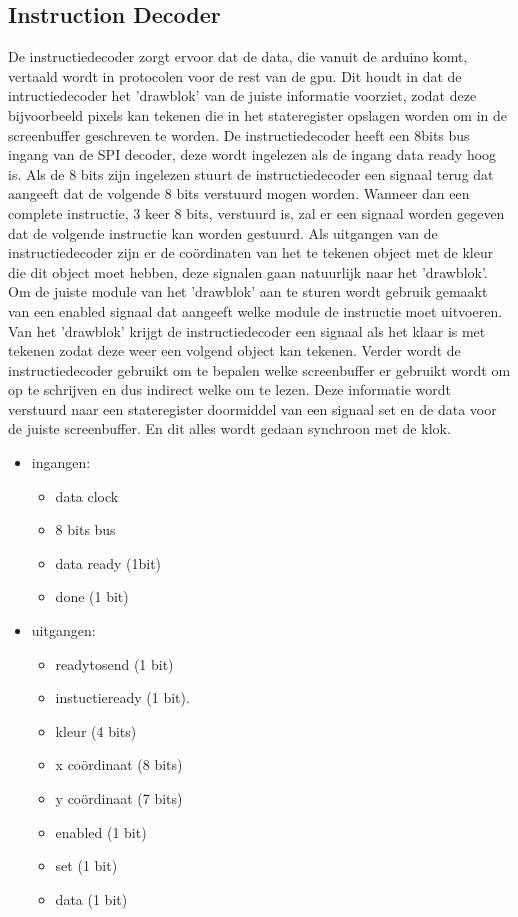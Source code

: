 \subsection{Instruction Decoder}
De instructiedecoder zorgt ervoor dat de data, die vanuit de arduino komt, vertaald wordt in protocolen voor de rest van de gpu. 
Dit houdt in dat de intructiedecoder het 'drawblok' van de juiste informatie voorziet, zodat deze bijvoorbeeld pixels kan tekenen die in het stateregister opslagen worden om in de screenbuffer geschreven te worden.
De instructiedecoder heeft een 8bits bus ingang van de SPI decoder, deze wordt ingelezen als de ingang data ready hoog is. Als de 8 bits zijn ingelezen stuurt de instructiedecoder een signaal terug dat aangeeft dat de volgende 8 bits verstuurd mogen worden.
Wanneer dan een complete instructie, 3 keer 8 bits, verstuurd is, zal er een signaal worden gegeven dat de volgende instructie kan worden gestuurd.
Als uitgangen van de instructiedecoder zijn er de coördinaten van het te tekenen object met de kleur die dit object moet hebben, deze signalen gaan natuurlijk naar het 'drawblok'.
Om de juiste module van het 'drawblok' aan te sturen wordt gebruik gemaakt van een enabled signaal dat aangeeft welke module de instructie moet uitvoeren.
Van het 'drawblok' krijgt de instructiedecoder een signaal als het klaar is met tekenen zodat deze weer een volgend object kan tekenen. 
Verder wordt de instructiedecoder gebruikt om te bepalen welke screenbuffer er gebruikt wordt om op te schrijven en dus indirect welke om te lezen. Deze informatie wordt verstuurd naar een stateregister doormiddel van een signaal set en de data voor de juiste screenbuffer.
En dit alles wordt gedaan synchroon met de klok.

\begin {itemize}
\item ingangen:
\begin{itemize}
\item data clock  
\item 8 bits bus 
\item data ready (1bit)
\item done (1 bit)
\end{itemize}

\item uitgangen:
\begin{itemize}
\item readytosend (1 bit)
\item instuctieready (1 bit).
\item kleur (4 bits)
\item x coördinaat (8 bits)
\item y coördinaat (7 bits)
\item enabled (1 bit)
\item set (1 bit)
\item data (1 bit)
\end{itemize}
\end{itemize}

